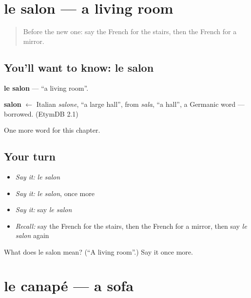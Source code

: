 \section[le salon]{le salon — a living room}

\label{lesson:FR-C75-salon}



\begin{quote}
Before the new one: say the French for the stairs, then the French for a mirror.
\end{quote}

\subsection*{You'll want to know: le salon}
\textbf{le salon} — \textquotedblleft{}a living room\textquotedblright{}.

\begin{cousinweb}
\textbf{salon} $\leftarrow$ Italian \emph{salone}, \textquotedblleft{}a large hall\textquotedblright{}, from \emph{sala}, \textquotedblleft{}a hall\textquotedblright{}, a Germanic word — borrowed. (EtymDB 2.1)
\end{cousinweb}

\begin{grammarlens}[title={What you've built}]
One more word for this chapter.
\end{grammarlens}

\subsection*{Your turn}
\begin{itemize}
\raggedright
  \item \emph{Say it:} \emph{le salon}
  \item \emph{Say it:} \emph{le salon}, once more
  \item \emph{Say it:} say \emph{le salon}
  \item \emph{Recall:} say the French for the stairs, then the French for a mirror, then say \emph{le salon} again
\end{itemize}

\begin{tcolorbox}[breakable,colback=teal!4,colframe=teal!35!black,title={Before you move on}]
What does le salon mean? (\textquotedblleft{}A living room\textquotedblright{}.) Say it once more.
\end{tcolorbox}
\section[le canapé]{le canapé — a sofa}

